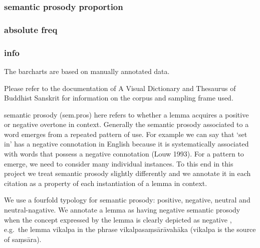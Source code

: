 \documentclass[
  letterpaper,
  DIV=11,
  numbers=noendperiod,
  oneside]{scrreprt}
\begin{document}
\hypertarget{semantic-prosody-proportion}{%
\subsubsection{semantic prosody
proportion}\label{semantic-prosody-proportion}}


\hypertarget{absolute-freq}{%
\subsubsection{absolute freq}\label{absolute-freq}}

\hypertarget{info-2}{%
\subsubsection{info}\label{info-2}}

The barcharts are based on manually annotated data.

Please refer to the documentation of A Visual Dictionary and Thesaurus
of Buddhist Sanskrit for information on the corpus and sampling frame
used.

semantic prosody (sem.pros) here refers to whether a lemma acquires a
positive or negative overtone in context. Generally the semantic prosody
associated to a word emerges from a repeated pattern of use. For example
we can say that `set in' has a negative connotation in English because
it is systematically associated with words that possess a negative
connotation (Louw 1993). For a pattern to emerge, we need to consider
many individual instances. To this end in this project we treat semantic
prosody slightly differently and we annotate it in each citation as a
property of each instantiation of a lemma in context.

We use a fourfold typology for semantic prosody: positive, negative,
neutral and neutral-nagative. We annotate a lemma as having negative
semantic prosody when the concept expressed by the lemma is clearly
depicted as negative , e.g.~the lemma vikalpa in the phrase
vikalpasaṃsārāvahāka (vikalpa is the source of saṃsāra).
\end{document}
